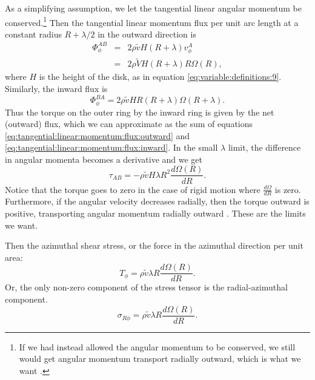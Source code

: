 \documentclass[]{article}
\newcommand{\dR}[1]{\frac{d #1}{dR}}
\begin{document}
As a simplifying assumption, we let the tangential linear angular
momentum be conserved.\footnote{If we had instead allowed the angular
  momentum to be conserved, we still would get angular momentum
  transport radially outward, which is what we want \cite{Frank}.}
Then the tangential linear momentum flux per unit arc length at a
constant radius $R+\lambda/2$ in the outward direction is \cite{Frank}
\begin{eqnarray}
  \Phi_\phi^{AB} &=& 2\rho \tilde{v} H (R+\lambda) v_\phi^A\nonumber\\
  \label{eq:tangential:linear:momentum:flux:outward}
  &=& 2\rho \tilde{V} H (R+\lambda)R\Omega(R),
\end{eqnarray}
where $H$ is the height of the disk, as in equation
\eqref{eq:variable:definitions:9}. Similarly, the inward flux is
\cite{Frank}
\begin{equation}
  \label{eq:tangential:linear:momentum:flux:inward}
  \Phi_\phi^{BA} = 2\rho\tilde{v} H R (R+\lambda) \Omega(R+\lambda).
\end{equation}
Thus the torque on the outer ring by the inward ring is given by the
net (outward) flux, which we can approximate as the sum of equations
\eqref{eq:tangential:linear:momentum:flux:outward} and
\eqref{eq:tangential:linear:momentum:flux:inward}. In the small
$\lambda$ limit, the difference in angular momenta becomes a
derivative and we get \cite{Frank,Melia}
\begin{equation}
  \label{eq:torque:AB}
  \tau_{AB} = -\rho\tilde{v}H\lambda R^2 \dR{\Omega(R)}.
\end{equation}
Notice that the torque goes to zero in the case of rigid motion where
$\dR{\Omega}$ is zero. Furthermore, if the angular velocity decreases
radially, then the torque outward is positive, transporting angular
momentum radially outward \cite{Melia}. These are the limits we want.

Then the azimuthal shear stress, or the force in the azimuthal
direction per unit area:
\begin{equation}
  \label{eq:azimuthal:shear:stress}
  T_{\phi} = \rho\tilde{v}\lambda R\dR{\Omega(R)}.
\end{equation}
Or, the only non-zero component of the stress tensor is the
radial-azimuthal component.
\begin{equation}
  \label{eq:stress:tensor:nonzero:1}
  \sigma_{R\phi} = \rho\tilde{v}\lambda R\dR{\Omega(R)}.
\end{equation}
\end{document}
